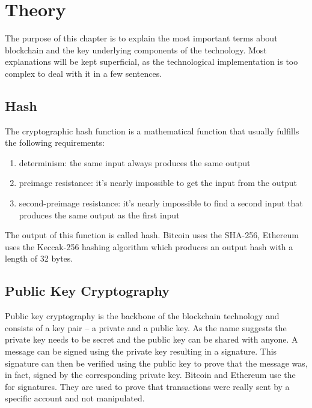 \section{Theory}
The purpose of this chapter is to explain the most important terms about blockchain and the key underlying components of the technology. Most explanations will be kept superficial, as the technological implementation is too complex to deal with it in a few sentences.
\\

\subsection{Hash}
The cryptographic hash function is a mathematical function that usually fulfills the following requirements\cite{hash}:
\begin{enumerate}
    \item determinism: the same input always produces the same output
    \item preimage resistance: it’s nearly impossible to get the input from the output
    \item second-preimage resistance: it’s nearly impossible to find a second input that produces the same output as the first input
\end{enumerate}
The output of this function is called hash. Bitcoin uses the SHA-256\cite{bitcoin-whitepaper}, Ethereum uses the Keccak-256\cite{ethereum-yellow-paper} hashing algorithm which produces an output hash with a length of 32 bytes.
\\

\subsection{Public Key Cryptography}
Public key cryptography\cite{public-key-cryptography} is the backbone of the blockchain technology and consists of a key pair – a private and a public key. As the name suggests the private key needs to be secret and the public key can be shared with anyone. A message can be signed using the private key resulting in a signature. This signature can then be verified using the public key to prove that the message was, in fact, signed by the corresponding private key. Bitcoin and Ethereum use the  for signatures. They are used to prove that transactions were really sent by a specific account and not manipulated.
\\

